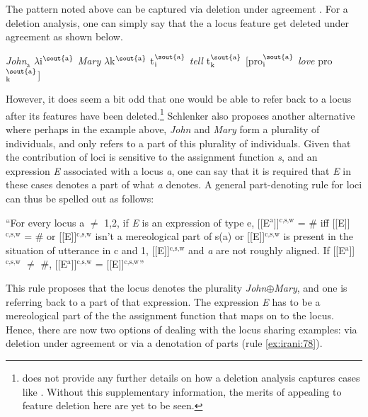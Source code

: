 \documentclass[output=paper,
modfonts
]{langscibook}
\begin{document}
The pattern noted above can be captured via deletion under agreement . For a deletion analysis, one can simply say that the a locus feature get deleted under agreement as shown below. 

\begin{exe}
	\ex \textit{John}$_\text{a}$ $\lambda$i$^{\text{\sout{a}}}$ \textit{Mary} $\lambda$k$^{\text{\sout{a}}}$ t$_\text{i}^{\text{\sout{a}}}$ \textit{tell} t$_\text{k}^{\text{\sout{a}}}$ [pro$_{\text{i}}^{\text{\sout{a}}}$ \textit{love} pro$_{\text{k}}^{\text{\sout{a}}}$] \citep[1079]{Schlenker2014}
\end{exe}

However, it does seem a bit odd that one would be able to refer back to a locus after its features have been deleted.\footnote{\citet{Schlenker2014} does not provide any further details on how a deletion analysis captures cases like . Without this supplementary information, the merits of appealing to feature deletion here are yet to be seen.} Schlenker also proposes another alternative where perhaps in the example above, \textit{John} and \textit{Mary} form a plurality of individuals, and  only refers to a part of this plurality of individuals. Given that the contribution of loci is sensitive to the assignment function \textit{s}, and an expression \textit{E} associated with a locus \textit{a}, one can say that it is required that \textit{E} in these cases denotes a part of what \textit{a} denotes. A general part-denoting rule for loci can thus be spelled out as follows:  

\begin{exe}
	\ex \label{ex:irani:78} ``For every locus a \(\neq\) 1,2, if \textit{E} is an expression of type e, {[}[E$^\text{a}$]{]}$^\text{{c,s,w}}$ = \# iff {[}[E]{]}$^\text{{c,s,w}}$ =  \# or {[}[E]{]}$^\text{{c,s,w}}$ isn't a mereological part of s(a) or {[}[E]{]}$^\text{{c,s,w}}$ is present in the situation of utterance in c and 1, {[}[E]{]}$^\text{{c,s,w}}$ and \textit{a} are not roughly aligned. If {[}[E$^\text{a}$]{]}$^\text{{c,s,w}}$ \(\neq\) \#, {[}[E$^\text{a}$]{]}$^\text{{c,s,w}}$ = {[}[E]{]}$^\text{{c,s,w}}$'' \citep[1080]{Schlenker2014}
\end{exe}

This rule proposes that the locus denotes the plurality \textit{John}\(\oplus\)\textit{Mary}, and one is referring back to a part of that expression. The expression \textit{E} has to be a mereological part of the the assignment function that maps on to the locus. Hence, there are now two options of dealing with the locus sharing examples: via deletion under agreement  or via a denotation of parts (rule \ref{ex:irani:78}). 
\end{document}
